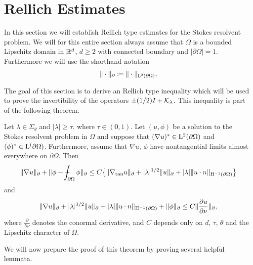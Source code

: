\chapter{Rellich Estimates}
\label{chap:4}

In this section we will establish Rellich type estimates for the Stokes resolvent problem.
We will for this entire section always assume that $\Omega$ is a bounded Lipschitz domain in $\mathbb{R}^d$, $d \geq 2$ with connected boundary and $|\partial\Omega| = 1$.
Furthermore we will use the shorthand notation
\begin{align*}
  \| \cdot \|_{\partial} \coloneqq \| \cdot \|_{\mathrm{L}^2(\partial\Omega)}.
\end{align*}

The goal of this section is to derive an Rellich type inequality which will be used to prove the invertibility of the operators $\pm(1/2)I + \mathcal{K}_{\lambda}$. 
This inequality is part of the following theorem.

\begin{thm}
  \label{thm:rellich}
  Let $\lambda \in \Sigma_\theta$ and $|\lambda| \geq \tau$, where 
  $\tau \in (0,1)$.
  Let $(u,\phi)$ be a solution to the Stokes resolvent problem in $\Omega$ and suppose that $(\nabla u)^* \in \mathrm{L}^2(\partial\Omega)$ and $(\phi)^* \in \mathrm{L}^(\partial\Omega)$.
  Furthermore, assume that $\nabla u$, $\phi$ have nontangential limits almost everywhere on $\partial\Omega$.
  Then
  \begin{align}
    \label{eq:rellich1}
    \|\nabla u\|_\partial + \|\phi - \dashint_{\partial\Omega} \phi \|_\partial
    \leq C \big\{ \|\nabla_{\mathrm{tan}} u\|_\partial + |\lambda|^{1/2} \|u\|_\partial + |\lambda| \|u \cdot n\|_{\HH^{-1}(\partial\Omega)} \big\}
  \end{align}
  and
  \begin{align}
    \label{eq:rellich2}
    \|\nabla u\|_\partial + |\lambda|^{1/2} \|u\|_\partial + |\lambda| \|u \cdot n\|_{\mathrm{H}^{-1}(\partial\Omega)} + \|\phi\|_\partial
    \leq C \|\frac{\partial u}{\partial \nu} \|_\partial,
  \end{align}
  where $\frac{\partial}{\partial \nu}$ denotes the conormal derivative, and $C$ depends only on $d$, $\tau$, $\theta$ and the Lipschitz character of $\Omega$.
\end{thm}

We will now prepare the proof of this theorem by proving several helpful lemmata.

